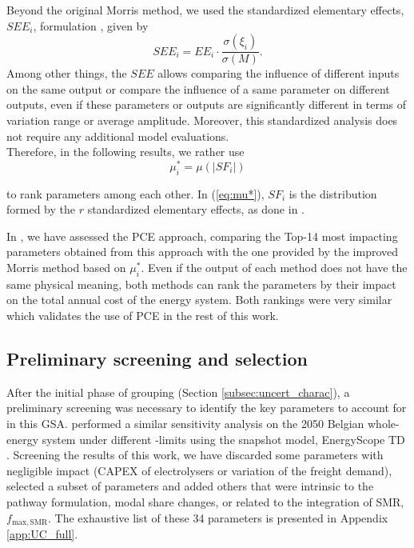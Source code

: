 Beyond the original Morris method, we used the standardized elementary effects, $SEE_{i}$, formulation \cite{Sin2009}, given by
\begin{equation}
    SEE_{i}=EE_{i}\cdot\frac{\sigma(\xi_i)}{\sigma(M)}.
\end{equation}
Among other things, the $SEE$ allows comparing the influence of different inputs on the same output or compare the influence of a same parameter on different outputs, even if these parameters or outputs are significantly different in terms of variation range or average amplitude. Moreover, this standardized analysis does not require any additional model evaluations.\\
Therefore, in the following results, we rather use
\begin{equation}
\mu^*_{i}=\mu(\vert SF_{i}\vert)
\label{eq:mu*}
\end{equation}

to rank parameters among each other. In (\ref{eq:mu*}), $SF_{i}$ is the distribution formed by the $r$ standardized elementary effects, as done in \citet{Moret2017PhDThesis}.

In \cite{limpens2020impact}, we have assessed the \gls{PCE} approach, comparing the Top-14 most impacting parameters obtained from this approach with the one provided by the improved Morris method based on $\mu^*_{i}$. Even if the output of each method does not have the same physical meaning, both methods can rank the parameters by their impact on the total annual  cost  of  the  energy  system. Both rankings were very similar which validates the use of \gls{PCE} in the rest of this work.


\subsection{Preliminary screening and selection}
\label{subsec:screening}

After the initial phase of grouping (Section \ref{subsec:uncert_charac}), a preliminary screening was necessary to identify the key parameters to account for in this \gls{GSA}. \citet{rixhon2021role} performed a similar sensitivity analysis on the 2050 Belgian whole-energy system under different -limits using the snapshot model, \ie EnergyScope TD \cite{limpens2019energyscope}. Screening the results of this work, we have discarded some parameters with negligible impact (\eg CAPEX of electrolysers or variation of the freight demand), selected a subset of parameters and added others that were intrinsic to the pathway formulation, \eg modal share changes, or related to the integration of \gls{SMR}, $f_{\mathrm{max,SMR}}$. The exhaustive list of these 34 parameters is presented in Appendix \ref{app:UC_full}.


